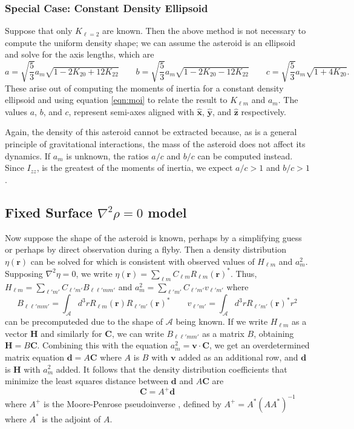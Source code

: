 \documentclass{aastex631}
\newcommand{\unit}[1]{\hat{\bm{#1}}}
\begin{document}
\subsubsection{Special Case: Constant Density Ellipsoid}
\label{sec:constant-density-ellipsoid}
Suppose that only $K_{\ell = 2}$ are known. Then the above method is not necessary to compute the uniform density shape; we can assume the asteroid is an ellipsoid and solve for the axis lengths, which are
\begin{equation}
a = \sqrt{\frac{5}{3}}a_m\sqrt{1-2K_{20}+12K_{22}} \qquad b = \sqrt{\frac{5}{3}}a_m\sqrt{1-2K_{20}-12K_{22}} \qquad c = \sqrt{\frac{5}{3}}a_m\sqrt{1+4K_{20}}.
\label{eqn:ellipsoid-klm}
\end{equation}
These arise out of computing the moments of inertia for a constant density ellipsoid and using equation \ref{eqn:moi} to relate the result to $K_{\ell m}$ and $a_m$. The values $a$, $b$, and $c$, represent semi-axes aligned with $\unit x$, $\unit y$, and $\unit z$ respectively.

Again, the density of this asteroid cannot be extracted because, as is a general principle of gravitational interactions, the mass of the asteroid does not affect its dynamics. If $a_m$ is unknown, the ratios $a/c$ and $b/c$ can be computed instead. Since $I_{zz}$, is the greatest of the moments of inertia, we expect $a/c > 1$ and $b/c > 1$. 


\subsection{Fixed Surface $\nabla^2 \rho = 0$ model}
\label{sec:laplace-rho}
Now suppose the shape of the asteroid is known, perhaps by a simplifying guess or perhaps by direct observation during a flyby. Then a density distribution $\eta(\bm r)$ can be solved for which is consistent with observed values of $H_{\ell m}$ and $a_m^2$. Supposing $\nabla^2 \eta = 0$, we write $\eta(\bm r) = \sum_{\ell m} C_{\ell m} R_{\ell m}(\bm r)^*$. Thus, $H_{\ell m} = \sum_{\ell' m'} C_{\ell' m'} B_{\ell \ell' m m'}$ and $a_m^2 = \sum_{\ell' m'} C_{\ell' m'} v_{\ell' m'}$ where
\begin{equation}
  B_{\ell \ell' m m'} = \int_{\mathcal{A}}d^3 r R_{\ell m}(\bm r) R_{\ell' m'}(\bm r)^* \qquad v_{\ell' m'} = \int_{\mathcal{A}}d^3 r R_{\ell' m'}(\bm r)^* r^2
  \label{eqn:blm}
\end{equation}
can be precomputeded due to the shape of $\mathcal{A}$ being known. If we write $H_{\ell m}$ as a vector $\bm H$ and similarly for $\bm C$, we can write $B_{\ell \ell' m m'}$ as a matrix $B$, obtaining $\bm H = B \bm C$. Combining this with the equation $a_m^2 = \bm v \cdot \bm C$, we get an overdetermined matrix equation $\bm d = A \bm C$ where $A$ is $B$ with $\bm v$ added as an additional row, and $\bm d$ is $\bm H$ with $a_m^2$ added. It follows that the density distribution coefficients that minimize the least squares distance between $\bm d$ and $A \bm C$ are 
\begin{equation}
\bm C = A^+ \bm d
\end{equation}
where $A^+$ is the Moore-Penrose pseudoinverse \cite{Barata2012}, defined by $A^+ = A^* (AA^*)^{-1}$ where $A^*$ is the adjoint of $A$.
\end{document}
